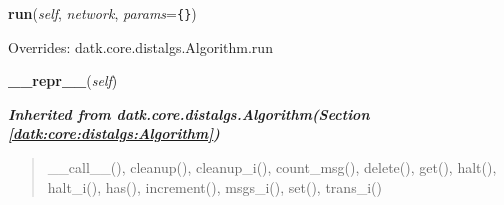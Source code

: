     \vspace{0.5ex}

\hspace{.8\funcindent}\begin{boxedminipage}{\funcwidth}

    \raggedright \textbf{run}(\textit{self}, \textit{network}, \textit{params}={\tt \texttt{\{}\texttt{\}}})

\setlength{\parskip}{2ex}
\setlength{\parskip}{1ex}
      Overrides: datk.core.distalgs.Algorithm.run

    \end{boxedminipage}

    \label{datk:core:distalgs:Chain:__repr__}

    \vspace{0.5ex}

\hspace{.8\funcindent}\begin{boxedminipage}{\funcwidth}

    \raggedright \textbf{\_\_repr\_\_}(\textit{self})

\setlength{\parskip}{2ex}
\setlength{\parskip}{1ex}
    \end{boxedminipage}


\large{\textbf{\textit{Inherited from datk.core.distalgs.Algorithm\textit{(Section \ref{datk:core:distalgs:Algorithm})}}}}

\begin{quote}
\_\_call\_\_(), cleanup(), cleanup\_i(), count\_msg(), delete(), get(), halt(), halt\_i(), has(), increment(), msgs\_i(), set(), trans\_i()
\end{quote}
